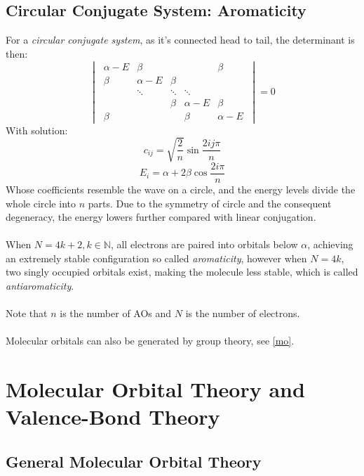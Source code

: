 \subsection{Circular Conjugate System: Aromaticity}\label{circonj}

	For a \emph{circular conjugate system}, as it's connected head to tail, the determinant is then:
	\[\begin{vmatrix}
	\ \alpha-E & \beta    &        &          & \beta\	\\
	\ \beta    & \alpha-E & \beta  &          & 		\\
	         & \ddots   & \ddots & \ddots   & 		\\
	         &          & \beta  & \alpha-E & \beta\ \\
	\ \beta	 &			&		 & \beta    & \alpha-E \ 
	\end{vmatrix} = 0\]
	With solution:
	\[c_{ij} =\sqrt{\frac{2}{n}}\sin\frac{2ij\pi}{n}\]
	\[E_i = \alpha+2\beta\cos\frac{2i\pi}{n}\]
	Whose coefficients resemble the wave on a circle, and the energy levels divide the whole circle into $n$ parts.
	Due to the symmetry of circle and the consequent degeneracy, the energy lowers further compared with linear conjugation.\\\ \\
	When $N=4k+2, k\in\mathbb{N}$, all electrons are paired into orbitals below $\alpha$, 
	achieving an extremely stable configuration so called \emph{aromaticity}, however when $N=4k$, 
	two singly occupied orbitals exist, making the molecule less stable, which is called \emph{antiaromaticity}.\\\ \\
	Note that $n$ is the number of AOs and $N$ is the number of electrons. \\\ \\
	Molecular orbitals can also be generated by group theory, see \ref{mo}.
		
	
\section{Molecular Orbital Theory and Valence-Bond Theory}
\subsection{General Molecular Orbital Theory}

